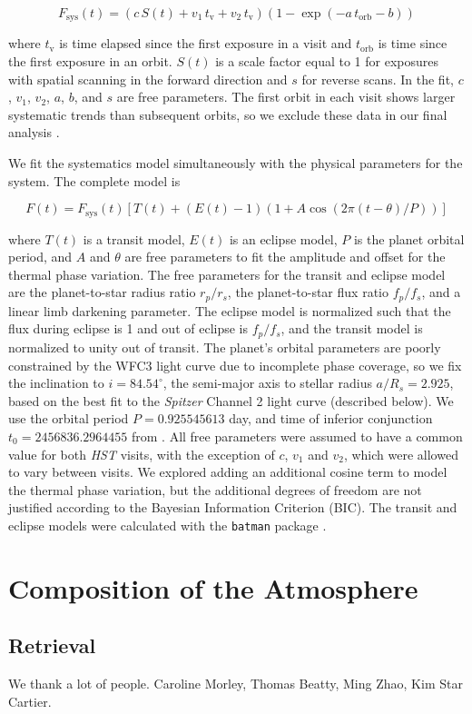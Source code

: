 \documentclass[twocolumn]{aastex61}
\begin{document}
\begin{equation}
 F_\mathrm{sys}(t) = (c\,S(t) + v_1\,t_\mathrm{v} + v_2\,t_\mathrm{v})(1 - \exp(-a\,t_\mathrm{orb} - b))
\end{equation}

\noindent where $t_\mathrm{v}$ is time elapsed since the first exposure in a visit and $t_\mathrm{orb}$ is time since the first exposure in an orbit. $S(t)$ is a scale factor equal to 1 for exposures with spatial scanning in the forward direction and $s$ for reverse scans. In the fit, $c$, $v_1$, $v_2$, $a$, $b$, and $s$ are free parameters. The first orbit in each visit shows larger systematic trends than subsequent orbits, so we exclude these data in our final analysis \citep[a common practice; see e.g.][]{kreidberg14a}.

We fit the systematics model simultaneously with the physical parameters for the system. The complete model is

\begin{equation}
F(t) = F_\mathrm{sys}(t)\left[T(t) + (E(t) - 1)(1 + A\cos(2\pi(t - \theta)/P))\right]
\label{eq:model}
\end{equation}

\noindent where $T(t)$ is a transit model, $E(t)$ is an eclipse model, $P$ is the planet orbital period, and $A$ and $\theta$ are free parameters to fit the amplitude and offset for the thermal phase variation. The free parameters for the transit and eclipse model are the planet-to-star radius ratio $r_p/r_s$, the planet-to-star flux ratio $f_p/f_s$, and a linear limb darkening parameter. The eclipse model is normalized such that the flux during eclipse is 1 and out of eclipse is $f_p/f_s$, and the transit model is normalized to unity out of transit. The planet's orbital parameters are poorly constrained by the WFC3 light curve due to incomplete phase coverage, so we fix the inclination to $i = 84.54^\circ$, the semi-major axis to stellar radius $a/R_s  = 2.925$, based on the best fit to the \emph{Spitzer} Channel 2 light curve (described below).  We use the orbital period $P = 0.925545613$ day, and time of inferior conjunction $t_0 = 2456836.2964455$ from \cite{southworth15}.  All free parameters were assumed to have a common value for both \emph{HST} visits, with the exception of $c$, $v_1$ and $v_2$, which were allowed to vary between visits. We explored adding an additional cosine term to model the thermal phase variation, but the additional degrees of freedom are not justified according to the Bayesian Information Criterion (BIC). The transit and eclipse models were calculated with the \texttt{batman} package \citep{kreidberg15a}. %

\section{Composition of the Atmosphere}

\subsection{Retrieval}


\acknowledgments
We thank a lot of people. Caroline Morley, Thomas Beatty, Ming Zhao, Kim Star Cartier.



\end{document}
